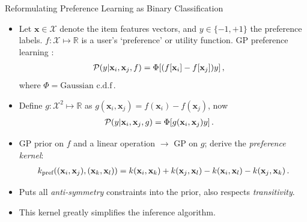\documentclass[final]{beamer}
\newlength{\onecolwid}
\newcommand{\x}{\mathbf{x}}
\begin{document}
\begin{frame}[t]
\begin{columns}[t]
\begin{column}{\onecolwid}
      \begin{block}{Reformulating Preference Learning as Binary Classification}
      \begin{itemize}
        \item Let $ \mathbf{x}\in\mathcal{X}$ denote the item features vectors, and
        $y\in\{-1,+1\}$ the preference labels.
        $ f:\mathcal{X}\mapsto\mathbb{R}$ is a user's `preference' or utility function.
        GP preference learning \cite{chu2005}:
        \begin{align}
          \mathcal{P}(y|\mathbf{x}_i,\mathbf{x}_j,f) &= \Phi[(f[\mathbf{x}_i] -
            f[\mathbf{x}_j])y]\,, \notag
        \end{align}
        where $\Phi = \text{Gaussian c.d.f}\,.$
        \item Define $g:\mathcal{X}^2\mapsto \mathbb{R}$ as $g(\x_i, \x_j) = f(\x_i) - f(\x_j)$, now
        \begin{align}
          \mathcal{P}(y|\mathbf{x}_i,\mathbf{x}_j,g) &= \Phi[g(\mathbf{x}_i,
          \mathbf{x}_j)y]\,. \notag
        \end{align}
        \item GP prior on $f$ and a linear operation $\rightarrow$ GP on $g$; derive the \emph{preference
          kernel}:
          \begin{align}
            k_\text{pref}((\x_i,\x_j),(\x_k,\x_l)) = k(\x_i,\x_k) + k(\x_j,\x_l) - k(\x_i,\x_l) -
            k(\x_j,\x_k)\,.\notag
          \end{align}
        \item Puts all \emph{anti-symmetry} constraints into the prior, also respects \emph{transitivity}.
        \item This kernel greatly simplifies the inference algorithm.
        \end{itemize}
      \end{block}


\end{column}
\end{columns}
\end{frame}
\end{document}
